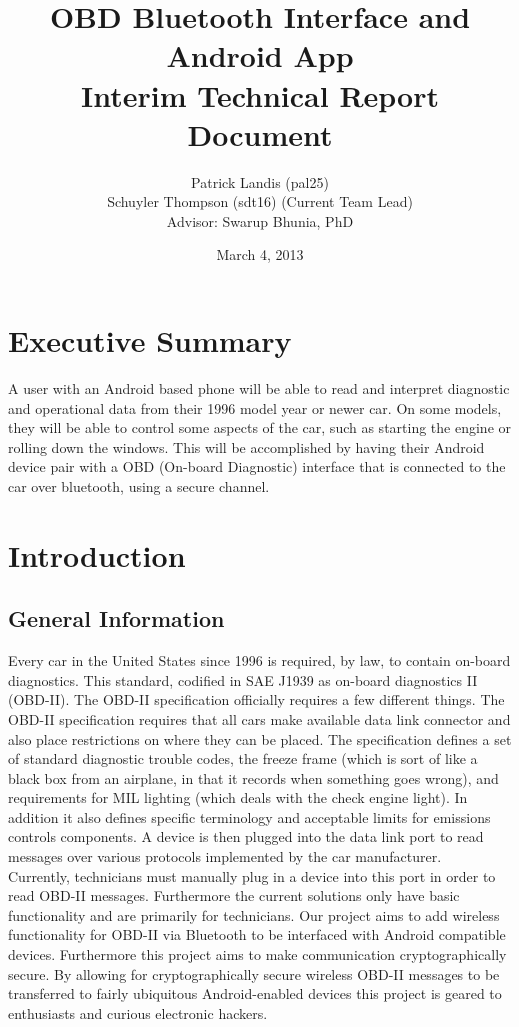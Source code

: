 \documentclass[12pt,letterpaper]{article}
\title{
\textbf{\LARGE OBD Bluetooth Interface and Android App} \\
\Large Interim Technical Report Document
}
\author{
\normalsize Patrick Landis (pal25) \\
\normalsize Schuyler Thompson (sdt16) (Current Team Lead) \\
\normalsize Advisor: Swarup Bhunia, PhD
}
\date{\normalsize March 4, 2013}
\begin{document}
\maketitle
\newpage

\section*{Executive Summary}
A user with an Android based phone will be able to read and interpret diagnostic and operational data from their 1996 model year or newer car. On some models, they will be able to control some aspects of the car, such as starting the engine or rolling down the windows. This will be accomplished by having their Android device pair with a OBD (On-board Diagnostic) interface that is connected to the car over bluetooth, using a secure channel. 

\newpage

\section{Introduction}
\subsection{General Information}
Every car in the United States since 1996 is required, by law, to contain on-board diagnostics. This standard, codified in SAE J1939 as on-board diagnostics II (OBD-II). The OBD-II specification officially requires a few different things. The OBD-II specification requires that all cars make available data link connector and also place restrictions on where they can be placed. The specification defines a set of standard diagnostic trouble codes, the freeze frame (which is sort of like a black box from an airplane, in that it records when something goes wrong), and requirements for MIL lighting (which deals with the check engine light). In addition it also defines specific terminology and acceptable limits for emissions controls components. A device is then plugged into the data link port to read messages over various protocols implemented by the car manufacturer. \\

Currently, technicians must manually plug in a device into this port in order to read OBD-II messages. Furthermore the current solutions only have basic functionality and are primarily for technicians. Our project aims to add wireless functionality for OBD-II via Bluetooth to be interfaced with Android compatible devices. Furthermore this project aims to make communication cryptographically secure. By allowing for cryptographically secure wireless OBD-II messages to be transferred to fairly ubiquitous Android-enabled devices this project is geared to enthusiasts and curious electronic hackers. \\
\end{document}
